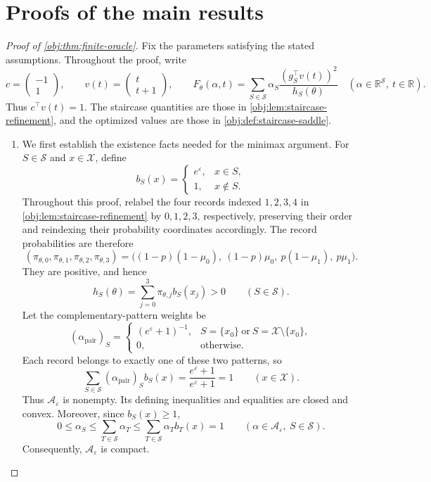 \documentclass[11pt]{article}
\begin{document}
\section{Proofs of the main results}\label{sec:deferred-proofs}

\begin{proof}[Proof of \cref{obj:thm:finite-oracle}]
Fix the parameters satisfying the stated assumptions. Throughout the proof, write
\[
c=\begin{pmatrix}-1\\1\end{pmatrix},
\qquad
v(t)=\begin{pmatrix}t\\t+1\end{pmatrix},
\qquad
F_\theta(\alpha,t)
=
\sum_{S\in\mathcal S}
\alpha_S\frac{(g_S^\top v(t))^2}{h_S(\theta)}
\quad
(\alpha\in\mathbb R^{\mathcal S},\ t\in\mathbb R).
\]
Thus \(c^\top v(t)=1\). The staircase quantities are those in
\cref{obj:lem:staircase-refinement}, and the optimized values are those in
\cref{obj:def:staircase-saddle}.

\begin{enumerate}
\item We first establish the existence facts needed for the minimax argument.
For \(S\in\mathcal S\) and \(x\in\mathcal X\), define
\[
b_S(x)=
\begin{cases}
e^\varepsilon,&x\in S,\\
1,&x\notin S.
\end{cases}
\]
Throughout this proof, relabel the four records indexed \(1,2,3,4\)
in \cref{obj:lem:staircase-refinement} by \(0,1,2,3\), respectively,
preserving their order and reindexing their probability coordinates
accordingly. The record probabilities are therefore
\[
(\pi_{\theta,0},\pi_{\theta,1},\pi_{\theta,2},\pi_{\theta,3})
=
\bigl(
(1-p)(1-\mu_0),\ (1-p)\mu_0,\
p(1-\mu_1),\ p\mu_1
\bigr).
\]
They are positive, and hence
\[
h_S(\theta)=\sum_{j=0}^3\pi_{\theta,j}b_S(x_j)>0
\qquad(S\in\mathcal S).
\]
Let the complementary-pattern weights be
\[
(\alpha_{\mathrm{pair}})_S=
\begin{cases}
(e^\varepsilon+1)^{-1},
&S=\{x_0\}\ \text{or}\ S=\mathcal X\setminus\{x_0\},\\
0,&\text{otherwise}.
\end{cases}
\]
Each record belongs to exactly one of these two patterns, so
\[
\sum_{S\in\mathcal S}
(\alpha_{\mathrm{pair}})_S b_S(x)
=\frac{e^\varepsilon+1}{e^\varepsilon+1}=1
\qquad(x\in\mathcal X).
\]
Thus \(\mathcal A_\varepsilon\) is nonempty. Its defining inequalities
and equalities are closed and convex. Moreover, since \(b_S(x)\ge1\),
\[
0\le\alpha_S\le\sum_{T\in\mathcal S}\alpha_T
\le\sum_{T\in\mathcal S}\alpha_Tb_T(x)=1
\qquad
(\alpha\in\mathcal A_\varepsilon,\ S\in\mathcal S).
\]
Consequently, \(\mathcal A_\varepsilon\) is compact.


\end{enumerate}
\end{proof}
\end{document}
